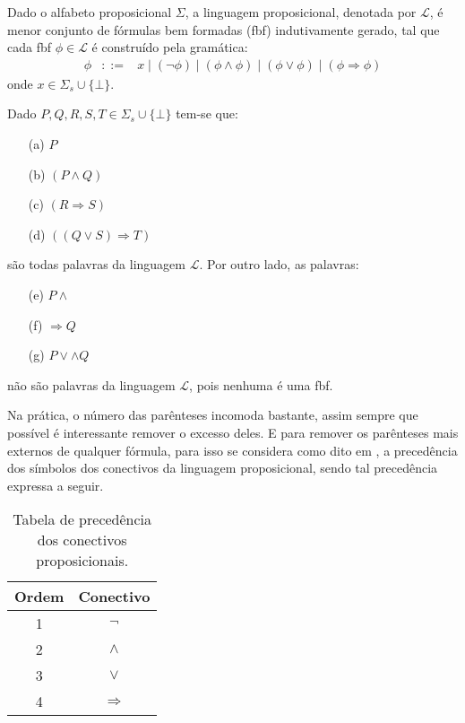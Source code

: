 \begin{definicao}\label{def:LinguagemProposicional}
  Dado o alfabeto proposicional $\Sigma$, a linguagem proposicional, denotada por $\mathcal{L}$, é menor conjunto de fórmulas bem formadas (fbf) indutivamente gerado, tal que cada fbf $\phi \in \mathcal{L}$ é construído pela gramática:
  \begin{eqnarray*}
    \phi & ::= & x \mid (\neg \phi) \mid (\phi \land \phi)  \mid (\phi \lor \phi) \mid (\phi \Rightarrow \phi) 
  \end{eqnarray*}
  onde $x \in \Sigma_s \cup \{\bot\}$.
\end{definicao}

\begin{exemplo}\label{exe:PalavrasProposicionaisBemFormadas}
  Dado $P, Q, R, S, T \in \Sigma_s \cup \{\bot\}$ tem-se que:
  \begin{itemize}
      \item[(a)] $P$
      \item[(b)] $(P \land Q)$
      \item[(c)] $(R \Rightarrow S)$
      \item[(d)] $((Q \lor S) \Rightarrow T)$
  \end{itemize}
  são todas palavras da linguagem $\mathcal{L}$. Por outro lado, as palavras:
  \begin{itemize}
      \item[(e)] $P \land$
      \item[(f)] $\Rightarrow Q$
      \item[(g)] $P \lor \land Q$
  \end{itemize}
  não são palavras da linguagem $\mathcal{L}$, pois nenhuma é uma fbf.
\end{exemplo}

Na prática, o número das parênteses incomoda bastante, assim sempre que possível é interessante remover o excesso deles. E para remover os parênteses mais externos de qualquer fórmula, para isso se considera como dito em \cite{stanford-dic-1}, a precedência dos símbolos dos conectivos da linguagem proposicional, sendo tal precedência expressa a seguir. 

\begin{table}[H]
  \centering
  \begin{tabular}{cc}
    \hline
    Ordem & Conectivo\\
    \hline 
    1 & $\neg$\\
    2 & $\land$\\
    3 & $\lor$\\
    4 & $\Rightarrow$\\
    \hline
  \end{tabular}
  \caption{Tabela de precedência dos conectivos proposicionais.}
  \label{tab:PrecedenciaProposicional}
\end{table}

